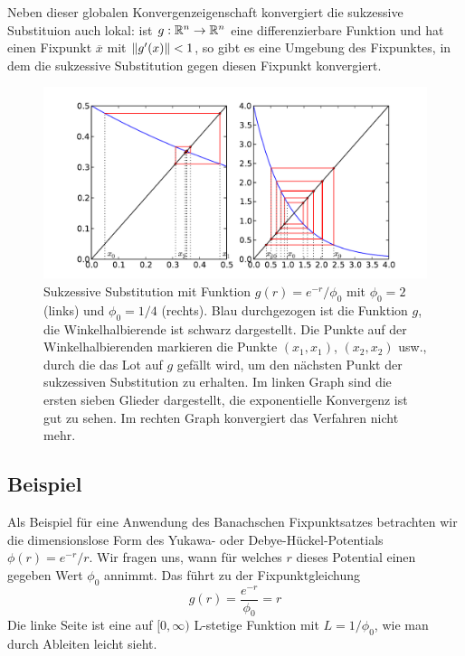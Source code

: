 Neben dieser globalen Konvergenzeigenschaft konvergiert die sukzessive
Substituion auch lokal: ist $g:\mathbb{R}^n\to\mathbb{R}^n$ eine differenzierbare
Funktion und hat einen Fixpunkt $\overline{x}$ mit $\left\lVert{g'(x)}\right\rVert < 1$,
so gibt es eine Umgebung des Fixpunktes, in dem die sukzessive
Substitution gegen diesen Fixpunkt konvergiert.

\begin{figure}
  \centering
  \includegraphics[width=\textwidth]{plots/banach}
  \caption{Sukzessive Substitution mit Funktion $g(r) = e^{-r}/\phi_0$
    mit $\phi_0=2$ (links) und $\phi_0=1/4$ (rechts). Blau
    durchgezogen ist die Funktion $g$, die Winkelhalbierende ist
    schwarz dargestellt. Die Punkte auf der Winkelhalbierenden
    markieren die Punkte $(x_1,x_1)$, $(x_2,x_2)$ usw., durch die das
    Lot auf $g$ gefällt wird, um den nächsten Punkt der sukzessiven
    Substitution zu erhalten. Im linken Graph sind die ersten sieben
    Glieder dargestellt, die exponentielle Konvergenz ist gut zu
    sehen. Im rechten Graph konvergiert das Verfahren nicht mehr.}
  \label{fig:banach}
\end{figure}

\subsection{Beispiel}

Als Beispiel für eine Anwendung des Banachschen Fixpunktsatzes
betrachten wir die dimensionslose Form des Yukawa- oder
Debye-Hückel-Potentials $\phi(r) = e^{-r}/r$. Wir fragen uns, wann für
welches $r$ dieses Potential einen gegeben Wert $\phi_0$ annimmt. Das
führt zu der Fixpunktgleichung
\begin{equation}
  g(r) = \frac{e^{-r}}{\phi_0} = r
\end{equation}
Die linke Seite ist eine auf $[0,\infty)$ L-stetige Funktion mit
$L=1/\phi_0$, wie man durch Ableiten leicht sieht.

